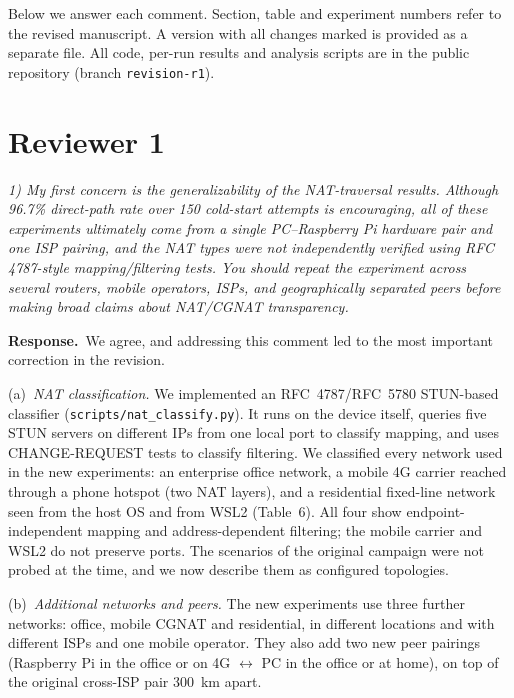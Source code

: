 \documentclass[11pt,a4paper]{article}
\newenvironment{comment}{\par\medskip\noindent\begin{minipage}{\linewidth}\color{blue!45!black}\itshape}{\end{minipage}\par}
\newcommand{\reply}{\par\smallskip\noindent\textbf{Response.}~}
\begin{document}
Below we answer each comment. Section, table and experiment numbers refer to the revised manuscript. A version with all changes marked is provided as a separate file. All code, per-run results and analysis scripts are in the public repository (branch \texttt{revision-r1}).

\section*{Reviewer 1}

\begin{comment}
1) My first concern is the generalizability of the NAT-traversal results. Although 96.7\% direct-path rate over 150 cold-start attempts is encouraging, all of these experiments ultimately come from a single PC--Raspberry Pi hardware pair and one ISP pairing, and the NAT types were not independently verified using RFC 4787-style mapping/filtering tests. You should repeat the experiment across several routers, mobile operators, ISPs, and geographically separated peers before making broad claims about NAT/CGNAT transparency.
\end{comment}
\reply We agree, and addressing this comment led to the most important correction in the revision.

(a)~\emph{NAT classification.} We implemented an RFC~4787/RFC~5780 STUN-based classifier (\texttt{scripts/\allowbreak nat\_classify.py}). It runs on the device itself, queries five STUN servers on different IPs from one local port to classify mapping, and uses CHANGE-REQUEST tests to classify filtering. We classified every network used in the new experiments: an enterprise office network, a mobile 4G carrier reached through a phone hotspot (two NAT layers), and a residential fixed-line network seen from the host OS and from WSL2 (Table~6). All four show endpoint-independent mapping and address-dependent filtering; the mobile carrier and WSL2 do not preserve ports. The scenarios of the original campaign were not probed at the time, and we now describe them as configured topologies.

(b)~\emph{Additional networks and peers.} The new experiments use three further networks: office, mobile CGNAT and residential, in different locations and with different ISPs and one mobile operator. They also add two new peer pairings (Raspberry Pi in the office or on 4G $\leftrightarrow$ PC in the office or at home), on top of the original cross-ISP pair 300~km apart.
\end{document}
